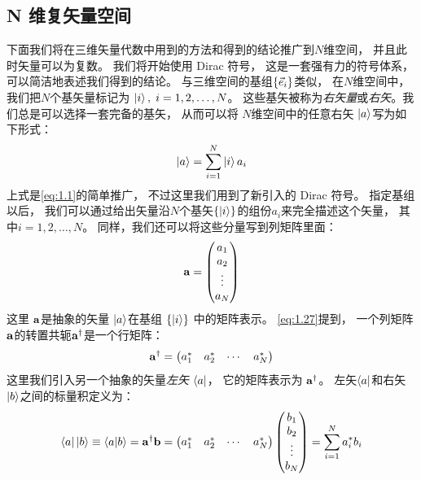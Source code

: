 \subsection{N 维复矢量空间}
\label{sec:1.1.4}
下面我们将在三维矢量代数中用到的方法和得到的结论推广到$N$维空间，
并且此时矢量可以为复数。
我们将开始使用 Dirac 符号，
这是一套强有力的符号体系，
可以简洁地表述我们得到的结论。
与三维空间的基组$\left\{ \vec{e}_{i} \right\}$类似，
在$N$维空间中，
我们把$N$个基矢量标记为 $\Ket{i},\; i = 1, 2, \dots, N$。
这些基矢被称为\emph{右矢量}或\emph{右矢}。我
们总是可以选择一套完备的基矢，
从而可以将 $N$维空间中的任意右矢 $\Ket{a}$写为如下形式：
\begin{equation}
 \Ket{a} = \sum_{i=1}^{N} \Ket{i} a_i
 \label{eq:1.41}
\end{equation}
上式是\autoref{eq:1.1}的简单推广，
不过这里我们用到了新引入的 Dirac 符号。
指定基组以后，
我们可以通过给出矢量沿$N$个基矢$\left\{\Ket{i}\right\}$的组份$a_i$来完全描述这个矢量，
其中$i = 1, 2, \dots, N$。
同样，我们还可以将这些分量写到列矩阵里面：
\begin{equation}
 {\mathbf a} = \begin{pmatrix}
     a_1 \\ a_2 \\ \vdots \\ a_N
 \end{pmatrix}
 \label{eq:1.42}
\end{equation}
这里 $\mathbf a$是抽象的矢量 $\Ket{a}$在基组 $\left\{\Ket{i}\right\}$ 中的矩阵表示。
\autoref{eq:1.27}提到，
一个列矩阵$\mathbf a$的转置共轭$\mathbf a^\dagger$是一个行矩阵：
\begin{equation}
 \mathbf a^\dagger = \begin{pmatrix}
     a_1^\ast & a_2^\ast &\cdots &a_N^\ast
 \end{pmatrix}
 \label{eq:1.43}
\end{equation}
这里我们引入另一个抽象的矢量\emph{左矢} $\Bra{a}$，
它的矩阵表示为 $\mathbf a^\dagger$。
左矢$\Bra{a}$和右矢$\Ket{b}$之间的标量积定义为：
\begin{equation}
 \Bra{a}\Ket{b} \equiv \langle a \vert b \rangle = \mathbf a^\dagger\mathbf{b} = \begin{pmatrix}
     a_1^\ast & a_2^\ast &\cdots &a_N^\ast
 \end{pmatrix} \begin{pmatrix}
     b_1 \\ b_2 \\ \vdots \\ b_N
 \end{pmatrix} = \sum_{i=1}^N a_i^\ast b_i
 \label{eq:1.44}
\end{equation}

